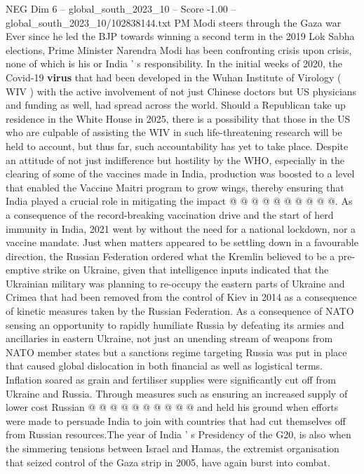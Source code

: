 \begin{textsample}{NEG Dim 6 – global\_south\_2023\_10 – Score -1.00 – global\_south\_2023\_10/102838144.txt}  \label{ex:f6_neg_146}
PM Modi steers through the Gaza war Ever since he led the BJP towards winning a second term in the 2019 Lok Sabha elections, Prime Minister Narendra Modi has been confronting crisis upon crisis, none of which is his or India ' s responsibility.
In the initial weeks of 2020, the Covid-19 \textbf{virus} that had been developed in the Wuhan Institute of Virology ( WIV ) with the active involvement of not just Chinese doctors but US physicians and funding as well, had spread across the world.
Should a Republican take up residence in the White House in 2025, there is a possibility that those in the US who are culpable of assisting the WIV in such life-threatening research will be held to account, but thus far, such accountability has yet to take place.
Despite an attitude of not just indifference but hostility by the WHO, especially in the clearing of some of the vaccines made in India, production was boosted to a level that enabled the Vaccine Maitri program to grow wings, thereby ensuring that India played a crucial role in mitigating the impact @ @ @ @ @ @ @ @ @ @.
As a consequence of the record-breaking vaccination drive and the start of herd immunity in India, 2021 went by without the need for a national lockdown, nor a vaccine mandate.
Just when matters appeared to be settling down in a favourable direction, the Russian Federation ordered what the Kremlin believed to be a pre-emptive strike on Ukraine, given that intelligence inputs indicated that the Ukrainian military was planning to re-occupy the eastern parts of Ukraine and Crimea that had been removed from the control of Kiev in 2014 as a consequence of kinetic measures taken by the Russian Federation.
As a consequence of NATO sensing an opportunity to rapidly humiliate Russia by defeating its armies and ancillaries in eastern Ukraine, not just an unending stream of weapons from NATO member states but a sanctions regime targeting Russia was put in place that caused global dislocation in both financial as well as logistical terms.
Inflation soared as grain and fertiliser supplies were significantly cut off from Ukraine and Russia.
Through measures such as ensuring an increased supply of lower cost Russian @ @ @ @ @ @ @ @ @ @ and held his ground when efforts were made to persuade India to join with countries that had cut themselves off from Russian resources.The year of India ' s Presidency of the G20, is also when the simmering tensions between Israel and Hamas, the extremist organisation that seized control of the Gaza strip in 2005, have again burst into combat.

\end{textsample}
